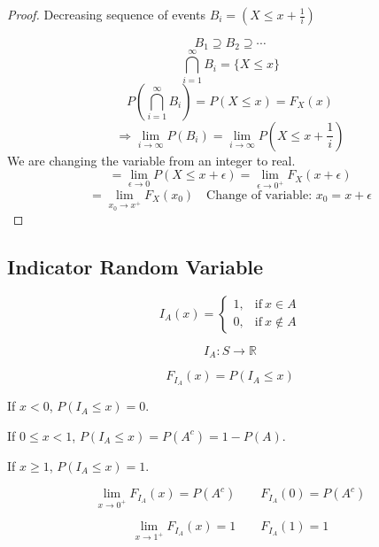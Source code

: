 \documentclass{article}
\begin{document}
\begin{enumerate}
    \begin{proof}
        Decreasing sequence of events $B_i= (X \leq x+\frac{1}{i})$

        $$ B_1 \supseteq B_2 \supseteq \cdots$$
        $$ \bigcap_{i=1}^{\infty}B_i= \{ X \leq x\}$$
        $$ P(\bigcap_{i=1}^{\infty}B_i) = P(X \leq x) = F_X(x)$$
        $$ \Rightarrow \lim_{i \to \infty}P(B_i)= \lim_{i \to \infty}P(X \leq x + \frac{1}{i})$$
        We are changing the variable from an integer to real.
        $$= \lim_{\epsilon \to 0}P(X \leq x + \epsilon)=\lim_{\epsilon \to 0^+}F_X(x + \epsilon) $$
        $$ = \lim_{x_0 \to x^+}F_X(x_0) \quad \text{Change of variable: }x_0= x+ \epsilon $$

    \end{proof}
\end{enumerate}

\subsection{Indicator Random Variable}
\begin{equation*}
    I_A (x)=
    \begin{cases}
      1, & \text{if}\ x \in A \\
      0, & \text{if}\ x \notin A
    \end{cases}
\end{equation*}

$$I_A:S \to \mathbb{R}$$

$$ F_{I_{A}} (x)= P(I_A \leq x)$$

If $x < 0 $, $P(I_A \leq x)= 0$.

If $0 \leq x <1 $, $P(I_A \leq x)= P(A^c)=1-P(A)$.

If $x \geq 1 $, $P(I_A \leq x)= 1$.

$$ \lim_{x \to 0^+} F_{I_A}(x)= P(A^c) \qquad F_{I_A}(0)= P(A^c)$$

$$ \lim_{x \to 1^+} F_{I_A}(x)= 1 \qquad F_{I_A}(1)= 1$$
\end{document}
